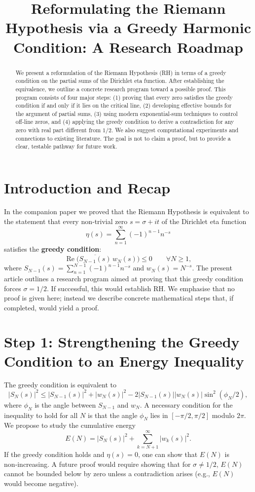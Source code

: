 \documentclass[12pt,a4paper]{article}
\title{Reformulating the Riemann Hypothesis via a Greedy Harmonic Condition:
A Research Roadmap}
\author{}
\date{}
\begin{document}
\maketitle

\begin{abstract}
We present a reformulation of the Riemann Hypothesis (RH) in terms of a greedy condition on the partial sums of the Dirichlet eta function. After establishing the equivalence, we outline a concrete research program toward a possible proof. This program consists of four major steps: (1) proving that every zero satisfies the greedy condition if and only if it lies on the critical line, (2) developing effective bounds for the argument of partial sums, (3) using modern exponential‑sum techniques to control off‑line zeros, and (4) applying the greedy condition to derive a contradiction for any zero with real part different from $1/2$. We also suggest computational experiments and connections to existing literature. The goal is not to claim a proof, but to provide a clear, testable pathway for future work.
\end{abstract}

\section{Introduction and Recap}

In the companion paper we proved that the Riemann Hypothesis is equivalent to the statement that every non‑trivial zero $s=\sigma+it$ of the Dirichlet eta function
\[
\eta(s)=\sum_{n=1}^\infty (-1)^{n-1}n^{-s}
\]
satisfies the \textbf{greedy condition}:
\[
\operatorname{Re}\bigl(\overline{S_{N-1}(s)}\,w_N(s)\bigr)\le 0\qquad\forall N\ge1,
\]
where $S_{N-1}(s)=\sum_{n=1}^{N-1}(-1)^{n-1}n^{-s}$ and $w_N(s)=N^{-s}$. The present article outlines a research program aimed at proving that this greedy condition forces $\sigma=1/2$. If successful, this would establish RH. We emphasise that no proof is given here; instead we describe concrete mathematical steps that, if completed, would yield a proof.

\section{Step 1: Strengthening the Greedy Condition to an Energy Inequality}

The greedy condition is equivalent to
\[
|S_N(s)|^2 \le |S_{N-1}(s)|^2 + |w_N(s)|^2 - 2|S_{N-1}(s)||w_N(s)|\sin^2(\phi_N/2),
\]
where $\phi_N$ is the angle between $S_{N-1}$ and $w_N$. A necessary condition for the inequality to hold for all $N$ is that the angle $\phi_N$ lies in $[-\pi/2,\pi/2]$ modulo $2\pi$. We propose to study the cumulative energy
\[
E(N)=|S_N(s)|^2 + \sum_{k=N+1}^\infty |w_k(s)|^2.
\]
If the greedy condition holds and $\eta(s)=0$, one can show that $E(N)$ is non‑increasing. A future proof would require showing that for $\sigma\neq1/2$, $E(N)$ cannot be bounded below by zero unless a contradiction arises (e.g., $E(N)$ would become negative).
\end{document}
